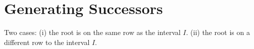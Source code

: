 \section{Generating Successors}
\label{sec::successors}
Two cases: (i) the root is on the same row as the interval $I$. (ii) the root is on a different row to the interval $I$.

